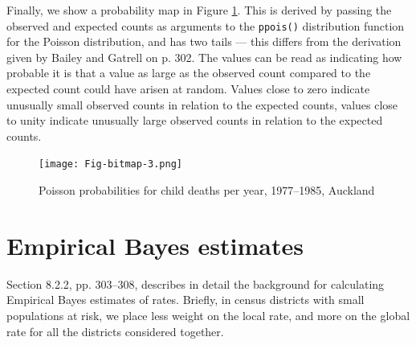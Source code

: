 \documentclass[a4paper,10pt]{article}
\newcommand{\code}[1]{\texttt{\small #1}}
\begin{document}
\begin{footnotesize}
\begin{Schunk}
\end{Schunk}
\begin{Schunk}
\end{Schunk}
\end{footnotesize}
Finally, we show a probability map in Figure \ref{pmap}. This is derived by passing the observed and expected counts as arguments to the \code{ppois()} distribution function for the Poisson distribution, and has two tails --- this differs from the derivation given by Bailey and Gatrell on p. 302. The values can be read as indicating how probable it is that a value as large as the observed count compared to the expected count could have arisen at random. Values close to zero indicate unusually small observed counts in relation to the expected counts, values close to unity indicate unusually large observed counts in relation to the expected counts.

\begin{figure}[htbp]
\begin{center} 
\texttt{[image: Fig-bitmap-3.png]}\end{center}
\caption{Poisson probabilities for child deaths per year, 1977--1985, Auckland}
\label{pmap}
\end{figure}

\section{Empirical Bayes estimates}

Section 8.2.2, pp. 303--308, describes in detail the background for calculating 
Empirical Bayes estimates of rates. Briefly, in census districts with small populations at risk, we place less weight on the local rate, and more on the global rate for all the districts considered together. 
\end{document}
